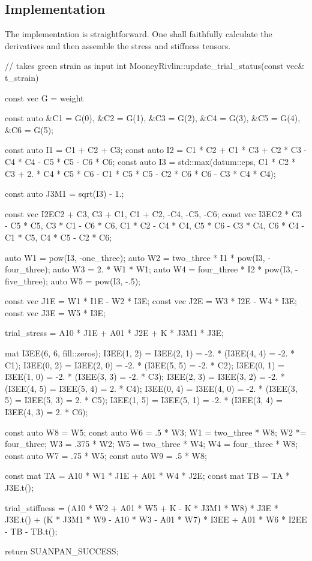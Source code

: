 \subsection{Implementation}
The implementation is straightforward.
One shall faithfully calculate the derivatives and then assemble the stress and stiffness tensors.
\begin{cppcode}
// takes green strain as input
int MooneyRivlin::update_trial_status(const vec& t_strain) {
    const vec G = weight %

    const auto &C1 = G(0), &C2 = G(1), &C3 = G(2), &C4 = G(3), &C5 = G(4), &C6 = G(5);

    const auto I1 = C1 + C2 + C3;
    const auto I2 = C1 * C2 + C1 * C3 + C2 * C3 - C4 * C4 - C5 * C5 - C6 * C6;
    const auto I3 = std::max(datum::eps, C1 * C2 * C3 + 2. * C4 * C5 * C6 - C1 * C5 * C5 - C2 * C6 * C6 - C3 * C4 * C4);

    const auto J3M1 = sqrt(I3) - 1.;

    const vec I2E{C2 + C3, C3 + C1, C1 + C2, -C4, -C5, -C6};
    const vec I3E{C2 * C3 - C5 * C5, C3 * C1 - C6 * C6, C1 * C2 - C4 * C4, C5 * C6 - C3 * C4, C6 * C4 - C1 * C5, C4 * C5 - C2 * C6};

    auto W1 = pow(I3, -one_three);
    auto W2 = two_three * I1 * pow(I3, -four_three);
    auto W3 = 2. * W1 * W1;
    auto W4 = four_three * I2 * pow(I3, -five_three);
    auto W5 = pow(I3, -.5);

    const vec J1E = W1 * I1E - W2 * I3E;
    const vec J2E = W3 * I2E - W4 * I3E;
    const vec J3E = W5 * I3E;

    trial_stress = A10 * J1E + A01 * J2E + K * J3M1 * J3E;

    mat I3EE(6, 6, fill::zeros);
    I3EE(1, 2) = I3EE(2, 1) = -2. * (I3EE(4, 4) = -2. * C1);
    I3EE(0, 2) = I3EE(2, 0) = -2. * (I3EE(5, 5) = -2. * C2);
    I3EE(0, 1) = I3EE(1, 0) = -2. * (I3EE(3, 3) = -2. * C3);
    I3EE(2, 3) = I3EE(3, 2) = -2. * (I3EE(4, 5) = I3EE(5, 4) = 2. * C4);
    I3EE(0, 4) = I3EE(4, 0) = -2. * (I3EE(3, 5) = I3EE(5, 3) = 2. * C5);
    I3EE(1, 5) = I3EE(5, 1) = -2. * (I3EE(3, 4) = I3EE(4, 3) = 2. * C6);

    const auto W8 = W5;
    const auto W6 = .5 * W3;
    W1 = two_three * W8;
    W2 *= four_three;
    W3 = .375 * W2;
    W5 = two_three * W4;
    W4 = four_three * W8;
    const auto W7 = .75 * W5;
    const auto W9 = .5 * W8;

    const mat TA = A10 * W1 * J1E + A01 * W4 * J2E;
    const mat TB = TA * J3E.t();

    trial_stiffness = (A10 * W2 + A01 * W5 + K - K * J3M1 * W8) * J3E * J3E.t() + (K * J3M1 * W9 - A10 * W3 - A01 * W7) * I3EE + A01 * W6 * I2EE - TB - TB.t();

    return SUANPAN_SUCCESS;
}
\end{cppcode}

